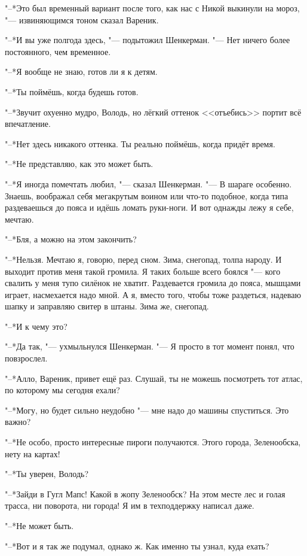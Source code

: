 "--*Это был временный вариант после того, как нас с Никой выкинули на мороз, "--- извиняющимся тоном сказал Вареник.

"--*И вы уже полгода здесь, "--- подытожил Шенкерман.
"--- Нет ничего более постоянного, чем временное.

"--*Я вообще не знаю, готов ли я к детям.

"--*Ты поймёшь, когда будешь готов.

"--*Звучит охуенно мудро, Володь, но лёгкий оттенок <<отъебись>> портит всё впечатление.

"--*Нет здесь никакого оттенка.
Ты реально поймёшь, когда придёт время.

"--*Не представляю, как это может быть.

"--*Я иногда помечтать любил, "--- сказал Шенкерман.
"--- В шараге особенно.
Знаешь, воображал себя мегакрутым воином или что-то подобное, когда типа раздеваешься до пояса и идёшь ломать руки-ноги.
И вот однажды лежу я себе, мечтаю.

"--*Бля, а можно на этом закончить?

"--*Нельзя.
Мечтаю я, говорю, перед сном.
Зима, снегопад, толпа народу.
И выходит против меня такой громила.
Я таких больше всего боялся "--- кого свалить у меня тупо силёнок не хватит.
Раздевается громила до пояса, мышцами играет, насмехается надо мной.
А я, вместо того, чтобы тоже раздеться, надеваю шапку и заправляю свитер в штаны.
Зима же, снегопад.

"--*И к чему это?

"--*Да так, "--- ухмыльнулся Шенкерман.
"--- Я просто в тот момент понял, что повзрослел.

\asterism

"--*Алло, Вареник, привет ещё раз.
Слушай, ты не можешь посмотреть тот атлас, по которому мы сегодня ехали?

"--*Могу, но будет сильно неудобно "--- мне надо до машины спуститься.
Это важно?

"--*Не особо, просто интересные пироги получаются.
Этого города, Зеленообска, нету на картах!

"--*Ты уверен, Володь?

"--*Зайди в Гугл Мапс!
Какой в жопу Зеленообск?
На этом месте лес и голая трасса, ни поворота, ни города!
Я им в техподдержку написал даже.

"--*Не может быть.

"--*Вот и я так же подумал, однако ж.
Как именно ты узнал, куда ехать?


